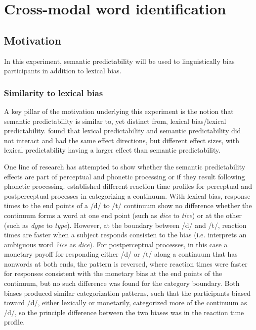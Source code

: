 
\chapter{Cross-modal word identification}


\section{Motivation}

In this experiment, semantic predictability will be used to linguistically bias participants in addition to lexical bias.  

\subsection{Similarity to lexical bias}

A key pillar of the motivation underlying this experiment is the notion that semantic predictability is similar to, yet distinct from, lexical bias/lexical predictability.  
\citet{Scarborough2010} found that lexical predictability and semantic predictability did not interact and had the same effect directions, but different effect sizes, with lexical predictability having a larger effect than semantic predictability.

One line of research has attempted to show whether the semantic predictability effects are part of perceptual and phonetic processing or if they result following phonetic processing.  \citet{Connine1987a} established different reaction time profiles for perceptual and postperceptual processes in categorizing a continuum.  With lexical bias, response times to the end points of a /d/ to /t/ continuum show no difference whether the continuum forms a word at one end point (such as \emph{dice} to \emph{tice}) or at the other (such as \emph{dype} to \emph{type}).  However, at the boundary between /d/ and /t/, reaction times are faster when a subject responds consisten to the bias (i.e. interprets an ambiguous word \emph{?ice} as \emph{dice}).  For postperceptual processes, in this case a monetary payoff for responding either /d/ or /t/ along a continuum that has nonwords at both ends, the pattern is reversed, where reaction times were faster for responses consistent with the monetary bias at the end points of the continuum, but no such difference was found for the category boundary.  Both biases produced similar categorization patterns, such that the participants biased toward /d/, either lexically or monetarily, categorized more of the continuum as /d/, so the principle difference between the two biases was in the reaction time profile.

